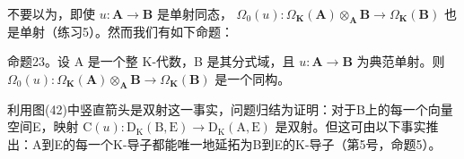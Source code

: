 不要以为，即使 \(u: \mathbf{A} \to \mathbf{B}\) 是单射同态， \(\Omega_0(u): \Omega_{\mathbf{K}}(\mathbf{A}) \otimes_{\mathbf{A}} \mathbf{B} \to \Omega_{\mathbf{K}}(\mathbf{B})\) 也是单射（练习5）。然而我们有如下命题：

命题23。设 A 是一个整 K-代数，B 是其分式域，且 \(u: \mathbf{A} \to \mathbf{B}\) 为典范单射。则 \(\Omega_0(u): \Omega_{\mathbf{K}}(\mathbf{A}) \otimes_{\mathbf{A}} \mathbf{B} \to \Omega_{\mathbf{K}}(\mathbf{B})\) 是一个同构。

利用图(42)中竖直箭头是双射这一事实，问题归结为证明：对于B上的每一个向量空间E，映射 \(\mathrm{C}(u):\mathrm{D}_{\mathrm{K}}(\mathrm{B},\mathrm{E})\to\mathrm{D}_{\mathrm{K}}(\mathrm{A},\mathrm{E})\) 是双射。但这可由以下事实推出：A到E的每一个K-导子都能唯一地延拓为B到E的K-导子（第5号，命题5）。

